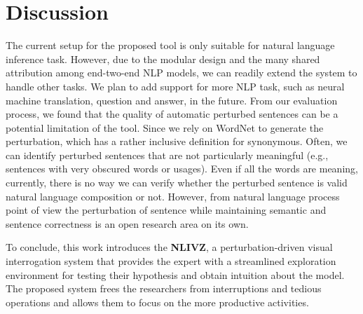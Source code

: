 \section{Discussion}
The current setup for the proposed tool is only suitable for natural language inference task. However, due to the modular design and the many shared attribution among end-two-end NLP models, we can readily extend the system to handle other tasks. We plan to add support for more NLP task, such as neural machine translation, question and answer, in the future.
%
From our evaluation process, we found that the quality of automatic perturbed sentences can be a potential limitation of the tool.
Since we rely on WordNet to generate the perturbation, which has a rather inclusive definition for synonymous. Often, we can identify perturbed sentences that are not particularly meaningful (e.g., sentences with very obscured words or usages). 
Even if all the words are meaning, currently, there is no way we can verify whether the perturbed sentence is valid natural language composition or not.
%
However, from natural language process point of view the perturbation of sentence while maintaining semantic and sentence correctness is an open research area on its own. 

To conclude, this work introduces the \textbf{NLIVZ}, a perturbation-driven visual interrogation system that provides the expert with a streamlined exploration environment for testing their hypothesis and obtain intuition about the model. The proposed system frees the researchers from interruptions and tedious operations and allows them to focus on the more productive activities.


